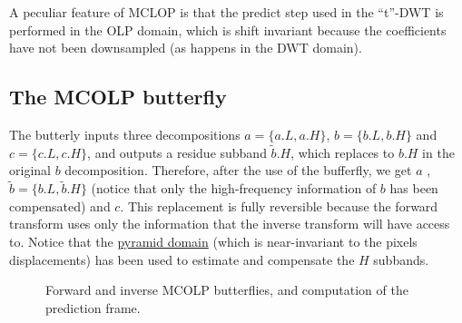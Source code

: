 A peculiar feature of MCLOP is that the predict step used in the
``t''-DWT is performed in the OLP domain, which is shift invariant
because the coefficients have not been downsampled (as happens in the
DWT domain).


\subsection{The MCOLP butterfly}

The butterly inputs three decompositions $a=\{a.L, a.H\}$, $b=\{b.L,
b.H\}$ and $c=\{c.L, c.H\}$, and outputs a residue subband
$\tilde{b}.H$, which replaces to $b.H$ in the original $b$
decomposition. Therefore, after the use of the bufferfly, we get $a$ ,
$\tilde{b}=\{b.L, \tilde{b}.H\}$ (notice that only the high-frequency
information of $b$ has been compensated) and $c$. This replacement is
fully reversible because the forward transform uses only the
information that the inverse transform will have access to. Notice
that the
\href{http://www.vtvt.ece.vt.edu/research/references/video/DCT_Video_Compression/Zhang92a.pdf}{pyramid
  domain} (which is near-invariant to the pixels displacements) has
been used to estimate and compensate the $H$ subbands.

\begin{figure}
  \centering {}
  
  
  \caption{Forward and inverse MCOLP butterflies, and computation of
    the prediction frame.}
  \label{fig:forward_butterfly}
\end{figure}




